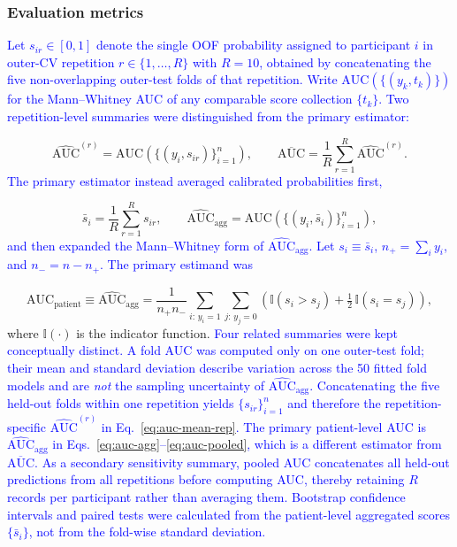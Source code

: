 \documentclass[review]{elsarticle}
\newcommand{\corrigir}[2]{%
	\textcolor{red}{\sout{#1}} %
	\textcolor{blue}{#2}%
}
\begin{document}
	\subsubsection{Evaluation metrics}
	\label{subsubsec:evaluation-metrics}
	
	\corrigir{}{Let $s_{ir}\in[0,1]$ denote the single OOF probability assigned to participant $i$ in outer-CV repetition $r\in\{1,\ldots,R\}$ with $R=10$, obtained by concatenating the five non-overlapping outer-test folds of that repetition. Write $\mathrm{AUC}(\{(y_k,t_k)\})$ for the Mann--Whitney AUC of any comparable score collection $\{t_k\}$. Two repetition-level summaries were distinguished from the primary estimator:}
	\begin{equation}
		\widehat{\mathrm{AUC}}^{(r)}
		=
		\mathrm{AUC}\!\left(\{(y_i,s_{ir})\}_{i=1}^{n}\right),
		\qquad
		\overline{\mathrm{AUC}}
		=
		\frac{1}{R}\sum_{r=1}^{R}\widehat{\mathrm{AUC}}^{(r)}.
		\label{eq:auc-mean-rep}
	\end{equation}
	\corrigir{}{The primary estimator instead averaged calibrated probabilities first,}
	\begin{equation}
		\bar{s}_i
		=
		\frac{1}{R}\sum_{r=1}^{R}s_{ir},
		\qquad
		\widehat{\mathrm{AUC}}_{\mathrm{agg}}
		=
		\mathrm{AUC}\!\left(\{(y_i,\bar{s}_i)\}_{i=1}^{n}\right),
		\label{eq:auc-agg}
	\end{equation}
	\corrigir{}{and then expanded the Mann--Whitney form of $\widehat{\mathrm{AUC}}_{\mathrm{agg}}$. Let $s_i\equiv\bar{s}_i$, $n_+=\sum_i y_i$, and $n_-=n-n_+$. The primary estimand was}
	\begin{equation}
		\mathrm{AUC}_{\mathrm{patient}}
		\equiv
		\widehat{\mathrm{AUC}}_{\mathrm{agg}}
		= \frac{1}{n_+ n_-}
		\sum_{i:\,y_i=1} \sum_{j:\,y_j=0}
		\left(
		\mathbb{I}(s_i > s_j)
		+ \tfrac{1}{2}\,\mathbb{I}(s_i = s_j)
		\right),
		\label{eq:auc-pooled}
	\end{equation}
	where $\mathbb{I}(\cdot)$ is the indicator function. \corrigir{}{Four related summaries were kept conceptually distinct. A fold AUC was computed only on one outer-test fold; their mean and standard deviation describe variation across the 50 fitted fold models and are \emph{not} the sampling uncertainty of $\widehat{\mathrm{AUC}}_{\mathrm{agg}}$. Concatenating the five held-out folds within one repetition yields $\{s_{ir}\}_{i=1}^{n}$ and therefore the repetition-specific $\widehat{\mathrm{AUC}}^{(r)}$ in Eq.~\eqref{eq:auc-mean-rep}. The primary patient-level AUC is $\widehat{\mathrm{AUC}}_{\mathrm{agg}}$ in Eqs.~\eqref{eq:auc-agg}--\eqref{eq:auc-pooled}, which is a different estimator from $\overline{\mathrm{AUC}}$. As a secondary sensitivity summary, pooled AUC concatenates all held-out predictions from all repetitions before computing AUC, thereby retaining $R$ records per participant rather than averaging them. Bootstrap confidence intervals and paired tests were calculated from the patient-level aggregated scores $\{\bar{s}_i\}$, not from the fold-wise standard deviation.}
	
\end{document}
